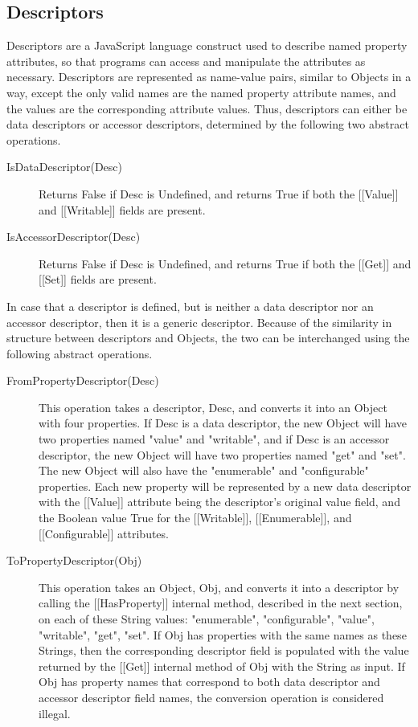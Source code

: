 \documentclass[a4paper,11pt,twoside]{report}
\begin{document}
\subsection{Descriptors}
Descriptors are a JavaScript language construct used to describe named property attributes, so that programs can access and manipulate the attributes as necessary. Descriptors are represented as name-value pairs, similar to Objects in a way, except the only valid names are the named property attribute names, and the values are the corresponding attribute values. Thus, descriptors can either be data descriptors or accessor descriptors, determined by the following two abstract operations.

\begin{description}
\item[IsDataDescriptor(Desc)] Returns False if Desc is Undefined, and returns True if both the [[Value]] and [[Writable]] fields are present.

\item[IsAccessorDescriptor(Desc)] Returns False if Desc is Undefined, and returns True if both the [[Get]] and [[Set]] fields are present.
\end{description}

In case that a descriptor is defined, but is neither a data descriptor nor an accessor descriptor, then it is a generic descriptor. Because of the similarity in structure between descriptors and Objects, the two can be interchanged using the following abstract operations.

\begin{description}
\item[FromPropertyDescriptor(Desc)] This operation takes a descriptor, Desc, and converts it into an Object with four properties. If Desc is a data descriptor, the new Object will have two properties named "value" and "writable", and if Desc is an accessor descriptor, the new Object will have two properties named "get" and "set". The new Object will also have the "enumerable" and "configurable" properties. Each new property will be represented by a new data descriptor with the [[Value]] attribute being the descriptor's original value field, and the Boolean value True for the [[Writable]], [[Enumerable]], and [[Configurable]] attributes.

\item[ToPropertyDescriptor(Obj)] This operation takes an Object, Obj, and converts it into a descriptor by calling the [[HasProperty]] internal method, described in the next section, on each of these String values: "enumerable", "configurable", "value", "writable", "get", "set". If Obj has properties with the same names as these Strings, then the corresponding descriptor field is populated with the value returned by the [[Get]] internal method of Obj with the String as input. If Obj has property names that correspond to both data descriptor and accessor descriptor field names, the conversion operation is considered illegal.
\end{description}
\end{document}
